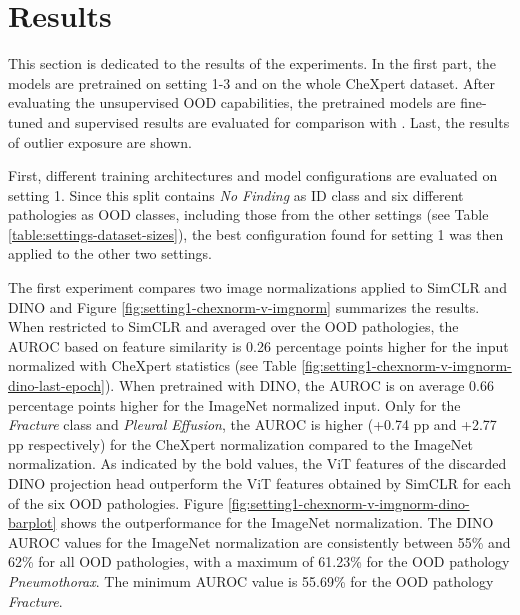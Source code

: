 \section{Results}
\label{section: results}
This section is dedicated to the results of the experiments.
In the first part, the models are pretrained on setting 1-3 and on the whole CheXpert dataset.
After evaluating the unsupervised OOD capabilities, the pretrained models are fine-tuned and supervised results are evaluated for comparison with \citep{Berger2021}.
Last, the results of outlier exposure are shown.
\par
First, different training architectures and model configurations are evaluated on setting 1.
Since this split contains \textit{No Finding} as ID class and six different pathologies as OOD classes, including those from the other settings (see Table \ref{table:settings-dataset-sizes}), the best configuration found for setting 1 was then applied to the other two settings.
\par
The first experiment compares two image normalizations applied to SimCLR and DINO and Figure \ref{fig:setting1-chexnorm-v-imgnorm} summarizes the results.
When restricted to SimCLR and averaged over the OOD pathologies, the AUROC based on feature similarity is 0.26 percentage points higher for the input normalized with CheXpert statistics (see Table \ref{fig:setting1-chexnorm-v-imgnorm-dino-last-epoch}).
When pretrained with DINO, the AUROC is on average 0.66 percentage points higher for the ImageNet normalized input.
Only for the \textit{Fracture} class and \textit{Pleural Effusion}, the AUROC is higher (+0.74 pp and +2.77 pp respectively) for the CheXpert normalization compared to the ImageNet normalization.
As indicated by the bold values, the ViT features of the discarded DINO projection head outperform the ViT features obtained by SimCLR for each of the six OOD pathologies.
Figure \ref{fig:setting1-chexnorm-v-imgnorm-dino-barplot} shows the outperformance for the ImageNet normalization.
The DINO AUROC values for the ImageNet normalization are consistently between 55\% and 62\% for all OOD pathologies, with a maximum of 61.23\% for the OOD pathology \textit{Pneumothorax}.
The minimum AUROC value is 55.69\% for the OOD pathology \textit{Fracture}.
